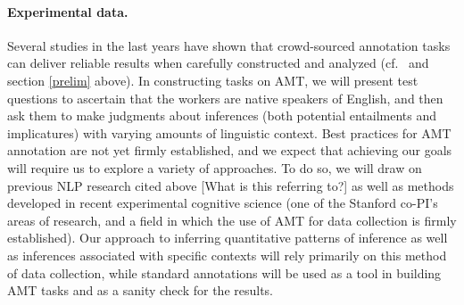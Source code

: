 \documentclass[10pt]{article}
\begin{document}


\vspace{-.15in}
\paragraph{Experimental data.}
Several studies in the last years have shown that crowd-sourced annotation tasks can deliver reliable results when carefully constructed and analyzed (cf.\ \cite{snow:08,munroetal2010} and section \ref{prelim} above). 
In constructing tasks on AMT, we will present test questions to ascertain that the workers are native speakers of English, and then ask them to make judgments about inferences (both potential entailments and implicatures) with varying amounts of linguistic context.
Best practices for AMT annotation are not yet firmly established, and we expect that achieving our goals will require us to explore a variety of approaches.
To do so, we will draw on previous NLP research cited above [What is this referring to?]  as well as methods developed in recent experimental cognitive science (one of the Stanford co-PI's areas of research, and a field in which the use of AMT for data collection is firmly established).
Our approach to inferring quantitative patterns of inference as well as inferences associated with specific contexts will rely primarily on this method of data collection, while standard annotations will be used as a tool in building AMT tasks and as a sanity check for the results. 
\end{document}
